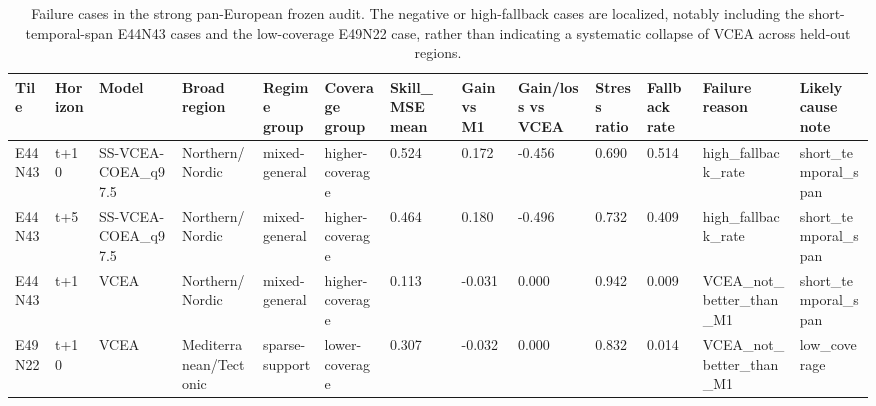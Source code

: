 \begin{table}[t]
\centering
\footnotesize
\begin{tabular}{lllllllllllll}
\toprule
Tile & Horizon & Model & Broad region & Regime group & Coverage group & Skill\_MSE mean & Gain vs M1 & Gain/loss vs VCEA & Stress ratio & Fallback rate & Failure reason & Likely cause note \\
\midrule
E44N43 & t+10 & SS-VCEA-COEA\_q97.5 & Northern/Nordic & mixed-general & higher-coverage & 0.524 & 0.172 & -0.456 & 0.690 & 0.514 & high\_fallback\_rate & short\_temporal\_span \\
E44N43 & t+5 & SS-VCEA-COEA\_q97.5 & Northern/Nordic & mixed-general & higher-coverage & 0.464 & 0.180 & -0.496 & 0.732 & 0.409 & high\_fallback\_rate & short\_temporal\_span \\
E44N43 & t+1 & VCEA & Northern/Nordic & mixed-general & higher-coverage & 0.113 & -0.031 & 0.000 & 0.942 & 0.009 & VCEA\_not\_better\_than\_M1 & short\_temporal\_span \\
E49N22 & t+10 & VCEA & Mediterranean/Tectonic & sparse-support & lower-coverage & 0.307 & -0.032 & 0.000 & 0.832 & 0.014 & VCEA\_not\_better\_than\_M1 & low\_coverage \\
\bottomrule
\end{tabular}
\caption{Failure cases in the strong pan-European frozen audit. The negative or high-fallback cases are localized, notably including the short-temporal-span E44N43 cases and the low-coverage E49N22 case, rather than indicating a systematic collapse of VCEA across held-out regions.}
\label{tab:e7_strong_failure_cases}
\end{table}

